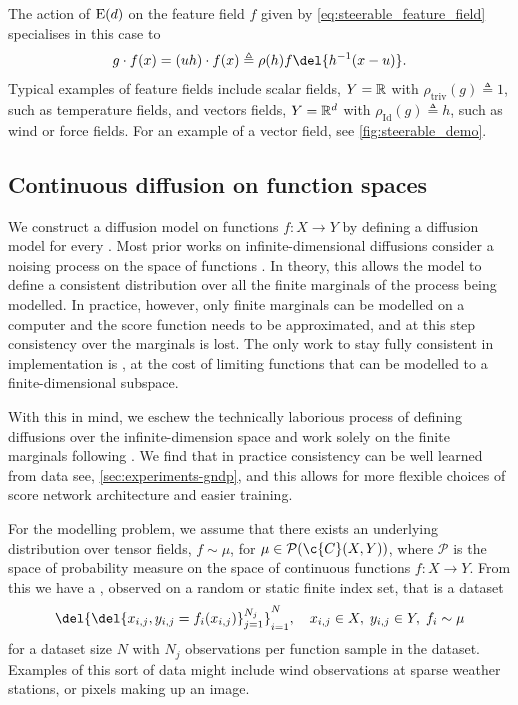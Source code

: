 The action of \(\groupE[d]{}\) on the feature field \(f\) given by \cref{eq:steerable_feature_field} specialises in this case to \[g \cdot f(x) = (uh) \cdot f(x) \triangleq \rho(h) f\del{h^{-1} (x - u)}.\]
Typical examples of feature fields include scalar fields, \(Y=\R\) with \(\rho_{\mathrm{triv}}(g) \triangleq 1\), such as temperature fields, and vectors fields, \(Y=\R^d\) with \(\rho_{\mathrm{Id}}(g) \triangleq h\), such as wind or force fields.
For an example of a vector field, see \cref{fig:steerable_demo}.

\subsection{Continuous diffusion on function spaces}
\label{sec:functional_diffusion}
We construct a diffusion model on functions \(f: X \rightarrow Y\) by defining a diffusion model for every .
Most prior works on infinite-dimensional diffusions consider a noising process on the space of functions \parencite{kerrigan2022Diffusion,pidstrigach2023InfiniteDimensional,lim2023score}.
In theory, this allows the model to define a consistent distribution over all the finite marginals of the process being modelled.
In practice, however, only finite marginals can be modelled on a computer and the score function needs to be approximated, and at this step consistency over the marginals is lost.
The only work to stay fully consistent in implementation is \textcite{phillips2022spectral}, at the cost of limiting functions that can be modelled to a finite-dimensional subspace.

With this in mind, we eschew the technically laborious process of defining diffusions over the infinite-dimension space and work solely on the finite marginals following \textcite{dutordoir2022Neural}.
We find that in practice consistency can be well learned from data see, \cref{sec:experiments-gndp}, and this allows for more flexible choices of score network architecture and easier training.

For the modelling problem, we assume that there exists an underlying distribution over tensor fields, \(f \sim \mu\), for \(\mu \in \mathcal{P}(\c{C}({X}, {Y}))\), where \(\mathcal{P}\) is the space of probability measure on the space of continuous functions \(f:X\to Y\).
From this we have a , observed on a random or static finite index set, that is a dataset
\[
	\del{\del{x_{i, j}, y_{i, j} = f_i(x_{i, j})}_{j=1}^{N_j}}_{i=1}^N, \quad x_{i,j}\in X, \; y_{i,j}\in Y	, \; f_i \sim \mu
\]
for a dataset size \(N\) with \(N_j\) observations per function sample in the dataset.
Examples of this sort of data might include wind observations at sparse weather stations, or pixels making up an image.

